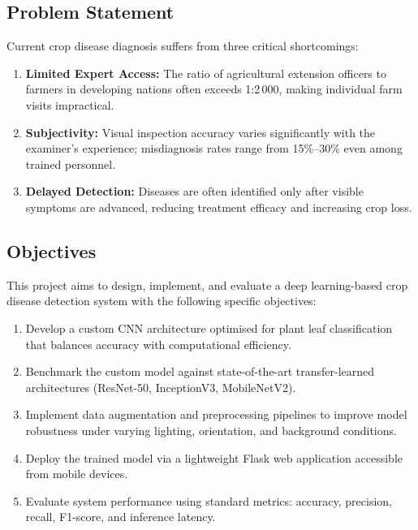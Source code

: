 \documentclass[11pt,a4paper]{article}
\begin{document}
\subsection{Problem Statement}

Current crop disease diagnosis suffers from three critical shortcomings:

\begin{enumerate}[label=\textcolor{accent}{\textbullet}, leftmargin=2em, itemsep=4pt]
  \item \textbf{Limited Expert Access:} The ratio of agricultural extension
        officers to farmers in developing nations often exceeds 1:2\,000,
        making individual farm visits impractical.
  \item \textbf{Subjectivity:} Visual inspection accuracy varies significantly
        with the examiner's experience; misdiagnosis rates range from
        15\%--30\% even among trained personnel.
  \item \textbf{Delayed Detection:} Diseases are often identified only after
        visible symptoms are advanced, reducing treatment efficacy and
        increasing crop loss.
\end{enumerate}

\subsection{Objectives}

This project aims to design, implement, and evaluate a deep learning-based
crop disease detection system with the following specific objectives:

\begin{enumerate}[label=\textbf{O\arabic*}, leftmargin=2.5em, itemsep=4pt]
  \item Develop a custom CNN architecture optimised for plant leaf
        classification that balances accuracy with computational efficiency.
  \item Benchmark the custom model against state-of-the-art transfer-learned
        architectures (ResNet-50, InceptionV3, MobileNetV2).
  \item Implement data augmentation and preprocessing pipelines to improve
        model robustness under varying lighting, orientation, and
        background conditions.
  \item Deploy the trained model via a lightweight Flask web application
        accessible from mobile devices.
  \item Evaluate system performance using standard metrics: accuracy,
        precision, recall, F1-score, and inference latency.
\end{enumerate}
\end{document}
